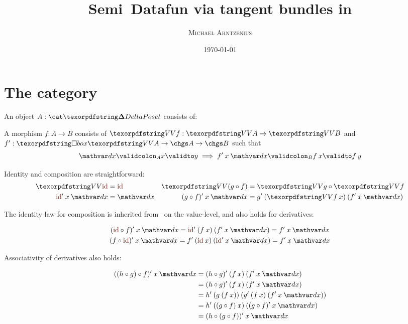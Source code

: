 \documentclass{rntz}
\title{Semi\naive\ Datafun via tangent bundles in \CP}
\author{\scshape Michael Arntzenius}
\date{\today}
\begin{document}
\maketitle


\section{The category \CP}

An object $A : \CP$ consists of:

\noindent
A morphism $f : A \to B$ consists of $\vals f : \vals A \to \vals B$ and $f' :
\iso \vals A \to \chgs A \to \chgs B$ such that
%
\begin{equation}\label{eqn:derivative}
  \validat A \dx x y \implies \validat B {f'\<x \<\dx}{f\<x}{f\<y}
\end{equation}

\noindent
Identity and composition are straightforward:
%
\begin{align*}
  \vals \id &= \id
  & \vals (g \circ f) &= \vals g \circ \vals f
  \\
  \id' \<x \<\dx &= \dx
  & (g \circ f)' \<x \<\dx &= g' \<(\vals f\<x) \<(f' \<x \<\dx)
\end{align*}

\noindent The identity law for composition is inherited from \Poset\ on the
value-level, and also holds for derivatives:

\begin{gather*}
  (\id \circ f)' \<x \<\dx = \id' \<(f\<x) \<(f'\<x\<\dx)
  = f'\<x\<\dx
  \\
  (f \circ \id)' \<x \<\dx = f' \<(\id\<x) \<(\id'\<x\<\dx)
  = f' \<x \<\dx
\end{gather*}

\noindent
Associativity of derivatives also holds:

\begin{align*}
  ((h \circ g) \circ f)' \<x \<\dx
  &= (h \circ g)' \<(f\<x) \<(f'\<x\<\dx)
  \\
  &= (h \circ g)' \<(f\<x) \<(f'\<x\<\dx)
  \\
  &= h' \<(g\<(f\<x)) \<(g' \<(f\<x) \<(f'\<x\<\dx))
  \\
  &= h' \<((g \circ f)\<x) \<((g \circ f)'\<x\<\dx)
  \\
  &= (h \circ (g \circ f))' \<x \<\dx
\end{align*}
\end{document}
